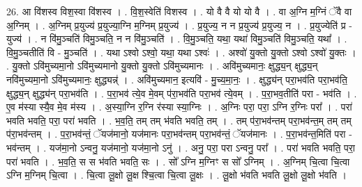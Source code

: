 \documentclass[17pt]{extarticle}
\begin{document}
26. आ वि॑शस्व विश॒स्वा वि॑शस्व । . वि॒श॒स्वेति॑ विशस्व । . यो वै वै यो यो वै । . वा अ॒ग्नि म॒ग्निं ॅवै वा अ॒ग्निम् । . अ॒ग्निम् प्र॒युज्य॑ प्र॒युज्या॒ग्नि म॒ग्निम् प्र॒युज्य॑ । . प्र॒युज्य॒ न न प्र॒युज्य॑ प्र॒युज्य॒ न । . प्र॒युज्येति॑ प्र - युज्य॑ । . न वि॑मु॒ञ्चति॑ विमु॒ञ्चति॒ न न वि॑मु॒ञ्चति॑ । . वि॒मु॒ञ्चति॒ यथा॒ यथा॑ विमु॒ञ्चति॑ विमु॒ञ्चति॒ यथा᳚ । . वि॒मु॒ञ्चतीति॑ वि - मु॒ञ्चति॑ । . यथा ऽश्वो ऽश्वो॒ यथा॒ यथा ऽश्वः॑ । . अश्वो॑ यु॒क्तो यु॒क्तो ऽश्वो ऽश्वो॑ यु॒क्तः । . यु॒क्तो ऽवि॑मुच्यमा॒नो ऽवि॑मुच्यमानो यु॒क्तो यु॒क्तो ऽवि॑मुच्यमानः । . अवि॑मुच्यमानः॒ क्षुद्ध्य॒न् क्षुद्ध्य॒न् नवि॑मुच्यमा॒नो ऽवि॑मुच्यमानः॒ क्षुद्ध्यन्न्॑ । . अवि॑मुच्यमान॒ इत्यवि॑ - मु॒च्य॒मा॒नः॒ । . क्षुद्ध्य॑न् परा॒भव॑ति परा॒भव॑ति॒ क्षुद्ध्य॒न् क्षुद्ध्य॑न् परा॒भव॑ति । . प॒रा॒भव॑ त्ये॒व मे॒वम् प॑रा॒भव॑ति परा॒भव॑ त्ये॒वम् । . प॒रा॒भव॒तीति॑ परा - भव॑ति । . ए॒व म॑स्या स्यै॒व मे॒व म॑स्य । . अ॒स्या॒ग्नि र॒ग्नि र॑स्या स्या॒ग्निः । . अ॒ग्निः परा॒ परा॒ ऽग्नि र॒ग्निः परा᳚ । . परा॑ भवति भवति॒ परा॒ परा॑ भवति । . भ॒व॒ति॒ तम् तम् भ॑वति भवति॒ तम् । . तम् प॑रा॒भव॑न्तम् परा॒भव॑न्त॒म् तम् तम् प॑रा॒भव॑न्तम् । . प॒रा॒भव॑न्तं॒ ॅयज॑मानो॒ यज॑मानः परा॒भव॑न्तम् परा॒भव॑न्तं॒ ॅयज॑मानः । . प॒रा॒भव॑न्त॒मिति॑ परा - भव॑न्तम् । . यज॑मा॒नो ऽन्वनु॒ यज॑मानो॒ यज॑मा॒नो ऽनु॑ । . अनु॒ परा॒ परा ऽन्वनु॒ परा᳚ । . परा॑ भवति भवति॒ परा॒ परा॑ भवति । . भ॒व॒ति॒ स स भ॑वति भवति॒ सः । . सो᳚ ऽग्नि म॒ग्निꣳ स सो᳚ ऽग्निम् । . अ॒ग्निम् चि॒त्वा चि॒त्वा ऽग्नि म॒ग्निम् चि॒त्वा । . चि॒त्वा लू॒क्षो लू॒क्ष श्चि॒त्वा चि॒त्वा लू॒क्षः । . लू॒क्षो भ॑वति भवति लू॒क्षो लू॒क्षो भ॑वति । \newline
\end{document}

